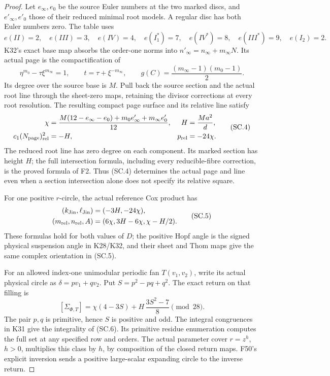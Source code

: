 \begin{proof}
Let \(e_\infty,e_0\) be the source Euler numbers at the two
marked discs, and \(e'_\infty,e'_0\) those of their reduced
minimal root models. A regular disc has both Euler numbers
zero. The table uses
\[
 e(II)=2,\quad e(III)=3,\quad e(IV)=4,\quad
 e(I_1^*)=7,\quad e(IV^*)=8,\quad e(III^*)=9,
 \quad e(I_2)=2.
\]
K32's exact base map absorbs the order-one norms into
\(n'_\infty=n_\infty+m_\infty N\). Its actual page is the
compactification of
\[
 \eta^{m_0}-\tau\xi^{m_\infty}=1,\qquad
 t=\tau+\xi^{-m_\infty},\qquad
 g(C)=\frac{(m_\infty-1)(m_0-1)}2.               \tag{SC.3}
\]
Its degree over the source base is \(M\). Pull back the
source section and the actual root line through the
sheet-zero maps, retaining the divisor corrections
at every root resolution. The resulting compact page
surface and its relative line satisfy
\[
 \begin{aligned}
 \chi&=\frac{M(12-e_\infty-e_0)
                 +m_0e'_\infty+m_\infty e'_0}{12},
 &H&=\frac{Ma^2}{d},\\
 c_1(N_{\rm page})_{\rm rel}^2&=-H,
 &p_{\rm rel}&=-24\chi.
 \end{aligned}                                  \tag{SC.4}
\]
The reduced root line has zero degree on each component.
Its marked section has height \(H\); the full intersection
formula, including every reducible-fibre correction,
is the proved formula of F2. Thus (SC.4) determines the
actual page and line even when a section intersection
alone does not specify its relative square.

For one positive \(r\)-circle, the actual reference Cox
product has
\[
 \begin{split}
 (k_{\rm Jin},\ell_{\rm Jin})&=(-3H,-24\chi),\\
 (m_{\rm rel},n_{\rm rel},A)&=
           (6\chi,3H-6\chi,\chi-H/2).
 \end{split}                                   \tag{SC.5}
\]
These formulas hold for both values of \(D\); the positive
Hopf angle is the signed physical suspension angle in
K28/K32, and their sheet and Thom maps give the same
complex orientation in (SC.5).

For an allowed index-one unimodular periodic fan
\(T(v_1,v_2)\), write its actual physical circle as
\(\delta=pv_1+qv_2\). Put \(S=p^2-pq+q^2\).
The exact return on that filling is
\[
 [\Sigma_{\Phi,T}]
       =\chi(4-3S)+H\,\frac{3S^2-7}{8}
                   \pmod {28}.                 \tag{SC.6}
\]
The pair \(p,q\) is primitive, hence \(S\) is positive
and odd. The integral congruences in K31 give the
integrality of (SC.6). Its primitive residue enumeration
computes the full set at any specified row and orders.
The actual parameter cover \(r=z^h\), \(h>0\), multiplies
this class by \(h\), by composition of the closed
return maps. F50's explicit inversion sends a positive
large-scalar expanding circle to the inverse return.


\end{proof}
